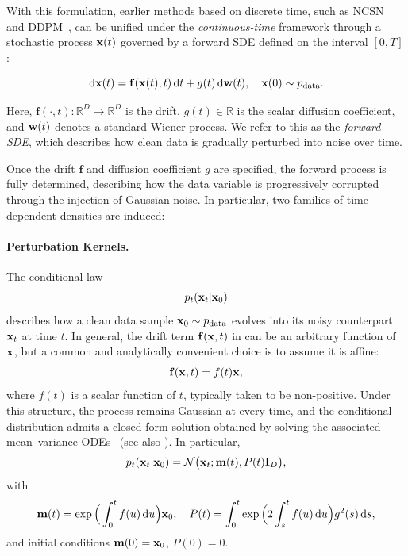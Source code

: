 With this formulation, earlier methods based on discrete time, such as NCSN~\citep{song2019generative} and DDPM~\citep{sohl2015deep,ho2020denoising}, can be unified under the \emph{continuous-time} framework through a stochastic process ${\mathbf{x}}(t)$ governed by a forward SDE defined on the interval $[0, T]$:
\begin{mdframed}
\begin{equation}\label{eq:sde_forward}
    \mathop{}\!\mathrm{d}{\mathbf{x}}(t) = \mathbf{f}({\mathbf{x}}(t), t) \mathop{}\!\mathrm{d} t + g(t) \mathop{}\!\mathrm{d}{\mathbf{w}}(t), \quad {\mathbf{x}}(0) \sim p_{\mathrm{data}}.
\end{equation}
\end{mdframed}
Here, $\mathbf{f}(\cdot, t)\colon\mathbb{R}^D\to\mathbb{R}^D$ is the drift, $g(t) \in \mathbb{R}$ is the scalar diffusion coefficient, and ${\mathbf{w}}(t)$ denotes a standard Wiener process. We refer to this as the \emph{forward SDE}, which describes how clean data is gradually perturbed into noise over time.

Once the drift $\mathbf{f}$ and diffusion coefficient $g$ are specified, the forward process is fully determined, describing how the data variable is progressively corrupted through the injection of Gaussian noise. In particular, two families of time-dependent densities are induced:
\paragraph{Perturbation Kernels.} 
The conditional law
\[
p_t({\mathbf{x}}_t |{\mathbf{x}}_0)
\]
describes how a clean data sample $ {\mathbf{x}}_0 \sim p_{\mathrm{data}} $ evolves into its noisy counterpart ${\mathbf{x}}_t$ at time $t$. In general, the drift term ${\mathbf{f}}({\mathbf{x}},t)$ in  can be an arbitrary function of ${\mathbf{x}}$, but a common and analytically convenient choice is to assume it is affine:
\begin{equation}\label{eq:affine-drift}
    {\mathbf{f}}({\mathbf{x}},t) = f(t) {\mathbf{x}}, 
\end{equation}
where $f(t)$ is a scalar function of $t$, typically taken to be non-positive. 
Under this structure, the process remains Gaussian at every time, and the conditional distribution admits a closed-form solution obtained by solving the associated mean–variance ODEs~\citep{sarkka2019applied} (see also ). {In particular,
\[
p_t({\mathbf{x}}_t |{\mathbf{x}}_0) = \mathcal{N} \big({\mathbf{x}}_t; {\mathbf{m}}(t), P(t)\mathbf I_D\big),
\]
with
\[
{\mathbf{m}}(t) = \exp \Big(\int_0^t f(u) \mathop{}\!\mathrm{d} u\Big) {\mathbf{x}}_0,
\quad
P(t) = \int_0^t \exp \Big(2 \int_s^t f(u) \mathop{}\!\mathrm{d} u\Big) g^2(s) \mathop{}\!\mathrm{d} s,
\]
and initial conditions ${\mathbf{m}}(0)={\mathbf{x}}_0$, $P(0)=0$.}

